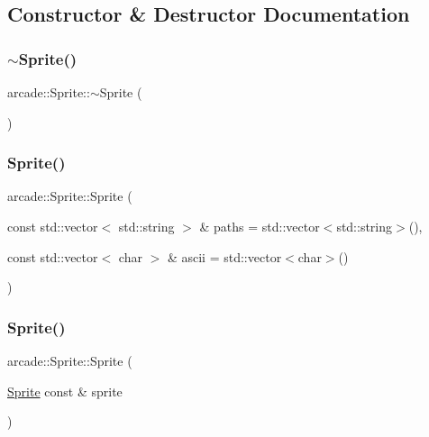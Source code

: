 \subsection{Constructor \& Destructor Documentation}
\mbox{\label{classarcade_1_1_sprite_a8e523ec675ab75663ba3fc33743aeb72}} 
\subsubsection{\texorpdfstring{$\sim$\+Sprite()}{~Sprite()}}
{\footnotesize\ttfamily arcade\+::\+Sprite\+::$\sim$\+Sprite (\begin{DoxyParamCaption}{ }\end{DoxyParamCaption})\hspace{0.3cm}{\ttfamily [virtual]}}

\mbox{\label{classarcade_1_1_sprite_a76833e28f549047d648f2b12694aa6df}} 
\subsubsection{\texorpdfstring{Sprite()}{Sprite()}\hspace{0.1cm}{\footnotesize\ttfamily [1/2]}}
{\footnotesize\ttfamily arcade\+::\+Sprite\+::\+Sprite (\begin{DoxyParamCaption}\item[{const std\+::vector$<$ std\+::string $>$ \&}]{paths = {\ttfamily std\+:\+:vector$<$std\+:\+:string$>$()},  }\item[{const std\+::vector$<$ char $>$ \&}]{ascii = {\ttfamily std\+:\+:vector$<$char$>$()} }\end{DoxyParamCaption})}

\mbox{\label{classarcade_1_1_sprite_ae7194e727354e7b6fd208e0cb72887b4}} 
\subsubsection{\texorpdfstring{Sprite()}{Sprite()}\hspace{0.1cm}{\footnotesize\ttfamily [2/2]}}
{\footnotesize\ttfamily arcade\+::\+Sprite\+::\+Sprite (\begin{DoxyParamCaption}\item[{\hyperlink{classarcade_1_1_sprite}{Sprite} const \&}]{sprite }\end{DoxyParamCaption})}



